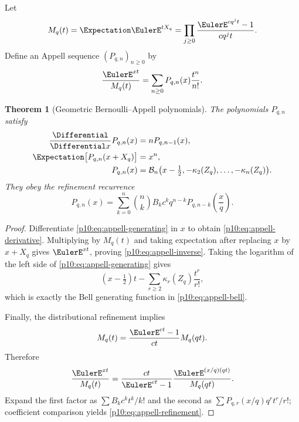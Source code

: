 \documentclass[11pt]{article}
\numberwithin{equation}{section}
\newtheorem{theorem}{Theorem}[section]
\theoremstyle{definition}
\theoremstyle{remark}
\begin{document}
Let
\begin{equation}
 M_q(t)=\Expectation\EulerE^{tX_q}
 =\prod_{j\ge0}\frac{\EulerE^{cq^jt}-1}{cq^jt}.                   \label{p10:eq:mgf-product}
\end{equation}
Define an Appell sequence $(P_{q,n})_{n\ge0}$ by
\begin{equation}
 \frac{\EulerE^{xt}}{M_q(t)}
 =\sum_{n\ge0}P_{q,n}(x)\frac{t^n}{n!}.                     \label{p10:eq:appell-generating}
\end{equation}

\begin{theorem}[Geometric Bernoulli--Appell polynomials]
\label{p10:thm:appell}
The polynomials $P_{q,n}$ satisfy
\begin{align}
 \frac{\Differential}{\Differential x}P_{q,n}(x)&=nP_{q,n-1}(x),                 \label{p10:eq:appell-derivative}\\
 \Expectation\bigl[P_{q,n}(x+X_q)\bigr]&=x^n,                         \label{p10:eq:appell-inverse}\\
 P_{q,n}(x)
 &=\mathcal B_n\bigl(x-\tfrac12,-\kappa_2(Z_q),\ldots,-\kappa_n(Z_q)\bigr). \label{p10:eq:appell-bell}
\end{align}
They obey the refinement recurrence
\begin{equation}
 \boxed{\displaystyle
 P_{q,n}(x)
 =\sum_{k=0}^{n}\binom nk B_k c^k q^{n-k}
 P_{q,n-k}\!\left(\frac{x}{q}\right).}                     \label{p10:eq:appell-refinement}
\end{equation}
\end{theorem}

\begin{proof}
Differentiate \eqref{p10:eq:appell-generating} in $x$ to obtain
\eqref{p10:eq:appell-derivative}.  Multiplying by $M_q(t)$ and taking expectation after replacing
$x$ by $x+X_q$ gives $\EulerE^{xt}$, proving \eqref{p10:eq:appell-inverse}.  Taking the logarithm of
the left side of \eqref{p10:eq:appell-generating} gives
\[
 (x-\tfrac12)t-\sum_{r\ge2}\kappa_r(Z_q)\frac{t^r}{r!},
\]
which is exactly the Bell generating function in \eqref{p10:eq:appell-bell}.

Finally, the distributional refinement implies
\[
 M_q(t)=\frac{\EulerE^{ct}-1}{ct}M_q(qt).
\]
Therefore
\[
 \frac{\EulerE^{xt}}{M_q(t)}
 =\frac{ct}{\EulerE^{ct}-1}
  \frac{\EulerE^{(x/q)(qt)}}{M_q(qt)}.
\]
Expand the first factor as $\sum B_kc^kt^k/k!$ and the second as
$\sum P_{q,r}(x/q)q^rt^r/r!$; coefficient comparison yields
\eqref{p10:eq:appell-refinement}.
\end{proof}
\end{document}
